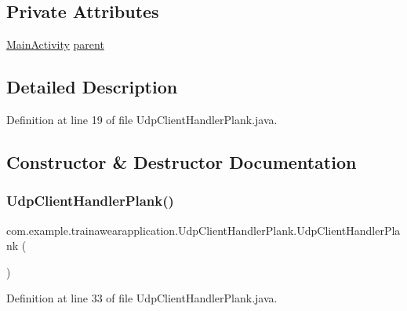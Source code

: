 \subsection*{Private Attributes}
\begin{DoxyCompactItemize}
\item 
\mbox{\hyperlink{classcom_1_1example_1_1trainawearapplication_1_1_main_activity}{Main\+Activity}} \mbox{\hyperlink{classcom_1_1example_1_1trainawearapplication_1_1_udp_client_handler_plank_a4ae127059889ca5270670220bb58b613}{parent}}
\end{DoxyCompactItemize}


\subsection{Detailed Description}


Definition at line 19 of file Udp\+Client\+Handler\+Plank.\+java.



\subsection{Constructor \& Destructor Documentation}
\mbox{\label{classcom_1_1example_1_1trainawearapplication_1_1_udp_client_handler_plank_a648a0fa42206709b739c8b754aa178dd}} 
\subsubsection{\texorpdfstring{UdpClientHandlerPlank()}{UdpClientHandlerPlank()}}
{\footnotesize\ttfamily com.\+example.\+trainawearapplication.\+Udp\+Client\+Handler\+Plank.\+Udp\+Client\+Handler\+Plank (\begin{DoxyParamCaption}{ }\end{DoxyParamCaption})}



Definition at line 33 of file Udp\+Client\+Handler\+Plank.\+java.


\begin{DoxyCode}{0}

\end{DoxyCode}


